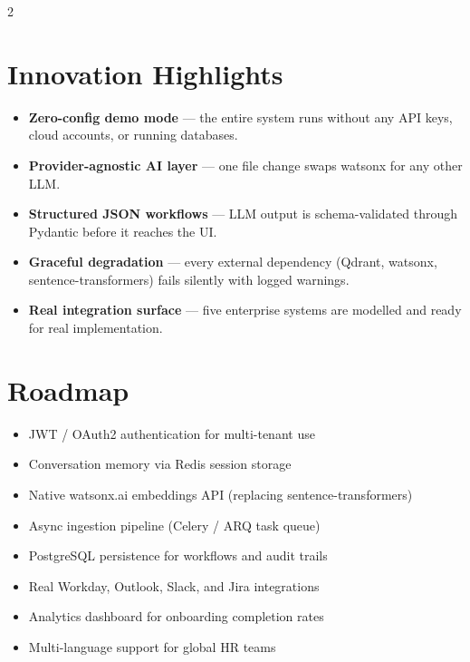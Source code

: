 \documentclass[10pt,a4paper]{article}
\begin{document}
\begin{multicols}{2}

\section{Innovation Highlights}

\begin{itemize}[leftmargin=1em,itemsep=2pt]
  \item \textbf{Zero-config demo mode} — the entire system runs without any
        API keys, cloud accounts, or running databases.
  \item \textbf{Provider-agnostic AI layer} — one file change swaps watsonx
        for any other LLM.
  \item \textbf{Structured JSON workflows} — LLM output is schema-validated
        through Pydantic before it reaches the UI.
  \item \textbf{Graceful degradation} — every external dependency (Qdrant,
        watsonx, sentence-transformers) fails silently with logged warnings.
  \item \textbf{Real integration surface} — five enterprise systems are
        modelled and ready for real implementation.
\end{itemize}

\columnbreak

\section{Roadmap}

\begin{itemize}[leftmargin=1em,itemsep=2pt]
  \item JWT / OAuth2 authentication for multi-tenant use
  \item Conversation memory via Redis session storage
  \item Native watsonx.ai embeddings API (replacing sentence-transformers)
  \item Async ingestion pipeline (Celery / ARQ task queue)
  \item PostgreSQL persistence for workflows and audit trails
  \item Real Workday, Outlook, Slack, and Jira integrations
  \item Analytics dashboard for onboarding completion rates
  \item Multi-language support for global HR teams
\end{itemize}

\end{multicols}

\vspace{8pt}
\end{document}
